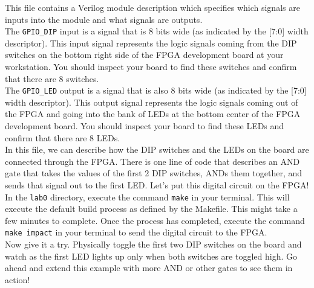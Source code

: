\documentclass[11pt]{article}
\begin{document}
This file contains a Verilog module description which specifies which signals are inputs into the module and what signals are outputs.\\ 

The \verb|GPIO_DIP| input is a signal that is 8 bits wide (as indicated by the [7:0] width descriptor). This input signal represents the logic signals coming from the DIP switches on the bottom right side of the FPGA development board at your workstation. You should inspect your board to find these switches and confirm that there are 8 switches. \\

The \verb|GPIO_LED| output is a signal that is also 8 bits wide (as indicated by the [7:0] width descriptor). This output signal represents the logic signals coming out of the FPGA and going into the bank of LEDs at the bottom center of the FPGA development board. You should inspect your board to find these LEDs and confirm that there are 8 LEDs. \\

In this file, we can describe how the DIP switches and the LEDs on the board are connected through the FPGA. There is one line of code that describes an AND gate that takes the values of the first 2 DIP switches, ANDs them together, and sends that signal out to the first LED. Let's put this digital circuit on the FPGA!\\

In the \verb|lab0| directory, execute the command \verb|make| in your terminal. This will execute the default build process as defined by the Makefile. This might take a few minutes to complete. Once the process has completed, execute the command \verb|make impact| in your terminal to send the digital circuit to the FPGA. \\

Now give it a try. Physically toggle the first two DIP switches on the board and watch as the first LED lights up only when both switches are toggled high. Go ahead and extend this example with more AND or other gates to see them in action!
\end{document}
